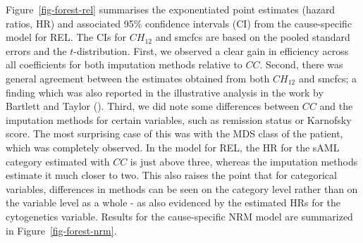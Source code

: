 \documentclass[
  letterpaper,
  paper=240mm:170mm,
  twoside=true,
  open=right,
  fontsize=10pt,
  pagesize=false,
  BCOR=15mm,
  DIV=14,
  headinclude=true,
  footinclude=false,
  headsepline=on]{scrbook}
\begin{document}
Figure~\ref{fig-forest-rel} summarises the exponentiated point estimates
(hazard ratios, HR) and associated 95\% confidence intervals (CI) from
the cause-specific model for REL. The CIs for \(CH_{12}\) and smcfcs are
based on the pooled standard errors and the \(t\)-distribution. First,
we observed a clear gain in efficiency across all coefficients for both
imputation methods relative to \(CC\). Second, there was general
agreement between the estimates obtained from both \(CH_{12}\) and
smcfcs; a finding which was also reported in the illustrative analysis
in the work by Bartlett and Taylor
(). Third, we
did note some differences between \(CC\) and the imputation methods for
certain variables, such as remission status or Karnofsky score. The most
surprising case of this was with the MDS class of the patient, which was
completely observed. In the model for REL, the HR for the sAML category
estimated with \(CC\) is just above three, whereas the imputation
methods estimate it much closer to two. This also raises the point that
for categorical variables, differences in methods can be seen on the
category level rather than on the variable level as a whole - as also
evidenced by the estimated HRs for the cytogenetics variable. Results
for the cause-specific NRM model are summarized in
Figure~\ref{fig-forest-nrm}.
\end{document}
